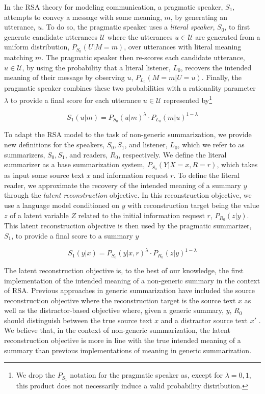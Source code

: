 \documentclass[11pt]{article}
\begin{document}
In the RSA theory for modeling communication, a pragmatic speaker, $S_1$, attempts to convey a message with some meaning, $m$, by generating an utterance, $u$. To do so, the pragmatic speaker uses a \emph{literal speaker}, $S_0$, to first generate candidate utterances $\mathcal{U}$ where the utterances $u \in \mathcal{U}$ are generated from a uniform distribution, $P_{S_0}(U | M = m)$, over utterances with literal meaning matching $m$. The pragmatic speaker then re-scores each candidate utterance, $u \in \mathcal{U}$, by using the probability that a literal listener, $L_0$, recovers the intended meaning of their message by observing $u$, $P_{L_0}(M = m | U = u)$. Finally, the pragmatic speaker combines these two probabilities with a rationality parameter $\lambda$ to provide a final score for each utterance $u \in \mathcal{U}$ represented by\footnote{We drop the $P_{S_1}$ notation for the pragmatic speaker as, except for $\lambda = 0,1$, this product does not necessarily induce a valid probability distribution.}

\begin{equation}
    S_1(u|m) = P_{S_0}(u|m)^\lambda \cdot P_{L_0}(m|u)^{1 - \lambda}
\end{equation}

To adapt the RSA model to the task of non-generic summarization, we provide new definitions for the speakers, $S_0,S_1$, and listener, $L_0$, which we refer to as summarizers, $S_0,S_1$, and readers, $R_0$, respectively. We define the literal summarizer as a base summarization system, $P_{S_0}(Y|X = x, R = r)$, which takes as input some source text $x$ and information request $r$. To define the literal reader, we approximate the recovery of the intended meaning of a summary $y$ through the \emph{latent reconstruction} objective. In this reconstruction objective, we use a language model conditioned on $y$ with reconstruction target being the value $z$ of a latent variable $Z$ related to the initial information request $r$, $P_{R_0}(z | y)$. This latent reconstruction objective is then used by the pragmatic summarizer, $S_1$, to provide a final score to a summary $y$

\begin{equation}
    \label{eqn:prag_summ}
    S_1(y|x) = P_{S_0}(y|x,r)^\lambda \cdot P_{R_0}(z|y)^{1 - \lambda}
\end{equation}

The latent reconstruction objective is, to the best of our knowledge, the first implementation of the intended meaning of a non-generic summary in the context of RSA. Previous approaches in generic summarization have included the source reconstruction objective where the reconstruction target is the source text $x$ as well as the distractor-based objective where, given a generic summary, $y$, $R_0$ should distinguish between the true source text $x$ and a distractor source text $x'$ \citep{andreasReasoningPragmaticsNeural2016,cohn-gordonPragmaticallyInformativeImage2018a, see-etal-2017-get}. We believe that, in the context of non-generic summarization, the latent reconstruction objective is more in line with the true intended meaning of a summary than previous implementations of meaning in generic summarization.
\end{document}
